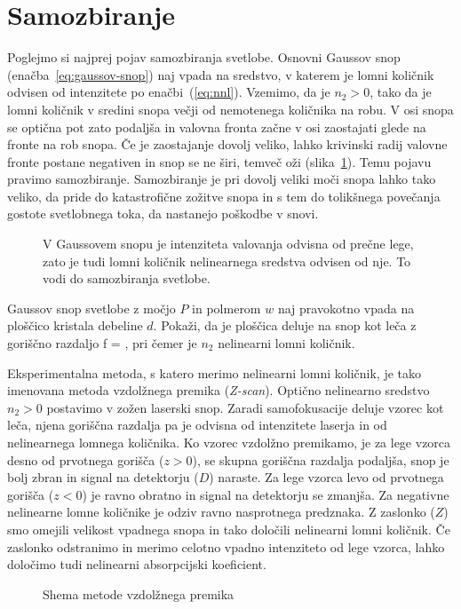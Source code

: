 \section{Samozbiranje}

Poglejmo si najprej pojav samozbiranja svetlobe. Osnovni Gaussov snop 
(enačba~\ref{eq:gaussov-snop}) naj vpada na sredstvo,
v katerem je lomni količnik odvisen od intenzitete po enačbi~(\ref{eq:nnl}).
Vzemimo, da je $n_{2}>0$, tako da je lomni količnik v sredini snopa večji 
od nemotenega količnika na robu. V osi snopa se optična pot zato podaljša in valovna fronta začne
v osi zaostajati glede na fronte na rob snopa. Če je zaostajanje dovolj veliko,
lahko krivinski radij valovne fronte postane negativen in snop se
ne širi, temveč oži (slika~\ref{fig:sf1}). Temu pojavu pravimo 
samozbiranje. Samozbiranje je pri dovolj
veliki moči snopa lahko tako veliko, da pride do katastrofične zožitve snopa
in s tem do tolikšnega povečanja gostote svetlobnega toka, da nastanejo
poškodbe v snovi.
\begin{figure}[h]
\centering
\def\svgwidth{90truemm} 

\caption{V Gaussovem snopu je intenziteta valovanja odvisna od prečne lege, zato
 je tudi lomni količnik nelinearnega sredstva odvisen od nje. To vodi do 
 samozbiranja svetlobe.}
\label{fig:sf1}
\end{figure}

\begin{definition}
Gaussov snop svetlobe z močjo $P$ in polmerom $w$ naj pravokotno vpada na ploščico
kristala debeline $d$. Pokaži, da je ploščica deluje na snop kot leča z goriščno razdaljo 
\beq
f = ,
\eeq
pri čemer je $n_2$ nelinearni lomni količnik.
\end{definition}

\begin{remark}
Eksperimentalna metoda, s katero merimo nelinearni lomni količnik, je tako imenovana
metoda vzdolžnega premika ({\it Z-scan}). Optično nelinearno sredstvo $n_2>0$ postavimo v zožen laserski
snop. Zaradi samofokusacije deluje vzorec kot leča, njena goriščna razdalja
pa je odvisna od intenzitete laserja in od nelinearnega lomnega količnika. Ko vzorec 
vzdolžno premikamo, je za lege vzorca desno od prvotnega gorišča ($z>0$), se skupna goriščna
razdalja podaljša, snop je bolj zbran in signal na detektorju ($D$) naraste. Za lege vzorca levo
od prvotnega gorišča ($z<0$) je ravno obratno in signal na detektorju se zmanjša. Za negativne 
nelinearne lomne količnike je odziv ravno nasprotnega predznaka. Z zaslonko ($Z$) smo omejili 
velikost vpadnega snopa in tako določili nelinearni lomni količnik. Če zaslonko odstranimo in merimo 
celotno vpadno intenziteto od lege vzorca, lahko določimo tudi nelinearni absorpcijski koeficient. 
\begin{figure}[h!]
\raggedleft 
\def\svgwidth{130truemm} 

\caption{Shema metode vzdolžnega premika}
\label{fig:zscan}
\end{figure}
\end{remark}

